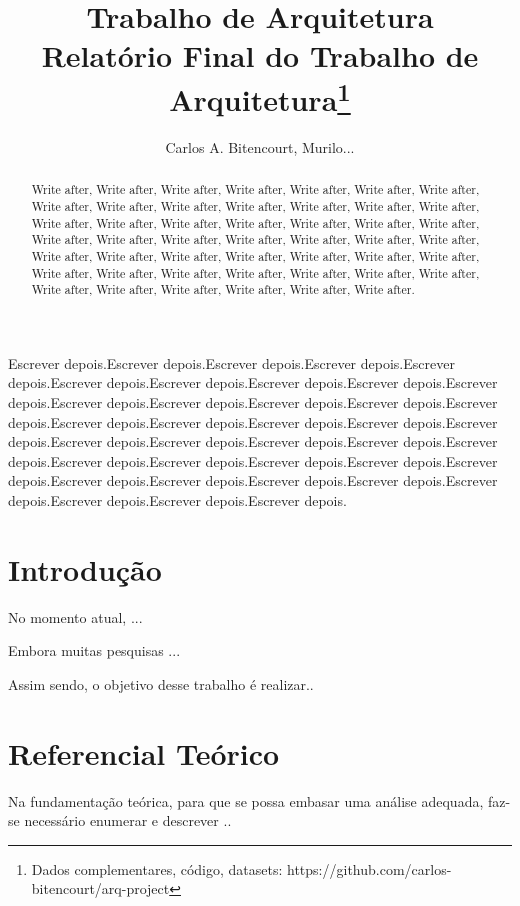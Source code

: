 \documentclass[12pt]{article}
\title{Trabalho de Arquitetura\\ Relatório Final do Trabalho de Arquitetura\footnote{Dados complementares, código, datasets: https://github.com/carlos-bitencourt/arq-project}}
\author{Carlos A. Bitencourt, Murilo...}
\begin{document}
\maketitle

\begin{abstract}
  Write after,   Write after, Write after, Write after, Write after, Write after, Write after, Write after, Write after, Write after, Write after, Write after, Write after, Write after, Write after, Write after, Write after, Write after, Write after, Write after, Write after, Write after, Write after, Write after, Write after, Write after, Write after, Write after, Write after, Write after, Write after, Write after, Write after, Write after, Write after, Write after, Write after, Write after, Write after, Write after, Write after, Write after, Write after, Write after, Write after, Write after, Write after, Write after.
\end{abstract}

\begin{resumo}
  Escrever depois.Escrever depois.Escrever depois.Escrever depois.Escrever depois.Escrever depois.Escrever depois.Escrever depois.Escrever depois.Escrever depois.Escrever depois.Escrever depois.Escrever depois.Escrever depois.Escrever depois.Escrever depois.Escrever depois.Escrever depois.Escrever depois.Escrever depois.Escrever depois.Escrever depois.Escrever depois.Escrever depois.Escrever depois.Escrever depois.Escrever depois.Escrever depois.Escrever depois.Escrever depois.Escrever depois.Escrever depois.Escrever depois.Escrever depois.Escrever depois.Escrever depois.Escrever depois.Escrever depois. 

\end{resumo}

\section{Introdução}

No momento atual, ...

Embora muitas pesquisas ...

Assim sendo, o objetivo desse trabalho é realizar..

\section{Referencial Teórico} \label{sec:refteorico}

Na fundamentação teórica, para que se possa embasar uma análise adequada, faz-se necessário enumerar e descrever ..
\end{document}
